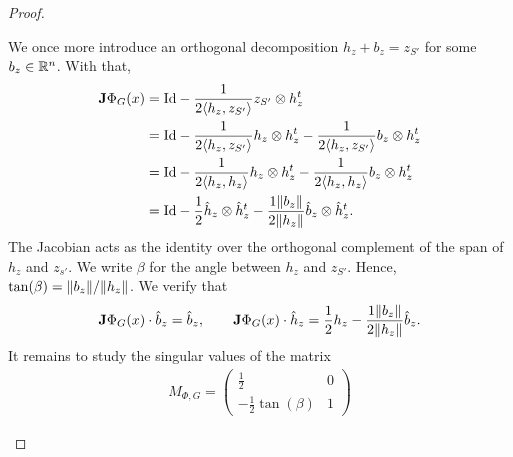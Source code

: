 \documentclass[10pt,a4paper]{article}
\begin{document}
\begin{proof}
\begin{itemize}
        We once more introduce an orthogonal decomposition $h_{z} + b_{z} = z_{S'}$ for some $b_{z} \in {\mathbb R}^{n}$.
        With that,
        \begin{align*}
            {\mathbf{J}} \Phi_{G}(x)
            &=
            {\rm Id} 
            - 
            \frac{1}{ 2 \langle h_{z},z_{S'}\rangle }  
            z_{S'} \otimes h_{z}^{t}
            \\
            &=
            {\rm Id} 
            - 
            \frac{1}{ 2 \langle h_{z},z_{S'}\rangle } 
            h_{z} \otimes h_{z}^{t}
            - 
            \frac{1}{ 2 \langle h_{z},z_{S'}\rangle } 
            b_{z} \otimes h_{z}^{t}
            \\
            &=
            {\rm Id} 
            - 
            \frac{1}{ 2 \langle h_{z}, h_{z}\rangle } 
            h_{z} \otimes h_{z}^{t}
            - 
            \frac{1}{ 2 \langle h_{z}, h_{z}\rangle } 
            b_{z} \otimes h_{z}^{t}
            \\
            &=
            {\rm Id} 
            - 
            \frac{1}{ 2 } 
            \hat h_{z} \otimes \hat h_{z}^{t}
            - 
            \frac{ 1 \|  b_{z}  \| }{ 2 \|  h_{z}  \| } 
            \hat b_{z} \otimes \hat h_{z}^{t}
            .
        \end{align*}
        The Jacobian acts as the identity over the orthogonal complement of the span of $h_{z}$ and $z_{s'}$.
        We write $\beta$ for the angle between $h_{z}$ and $z_{S'}$.
        Hence, $\tan(\beta) = \|  b_{z}  \| / \|  h_{z}  \|$. 
        We verify that 
        \begin{align}
            {\mathbf{J}} \Phi_{G}(x) \cdot \hat b_{z} = \hat b_{z},
            \qquad 
            {\mathbf{J}} \Phi_{G}(x) \cdot \hat h_{z} = \frac 1 2 h_{z} - \frac{ 1 \|  b_{z}  \| }{ 2 \|  h_{z}  \| } \hat b_{z}
            .
        \end{align}
        It remains to study the singular values of the matrix 
        \begin{align*}
            M_{\Phi,G} 
            = 
            \begin{pmatrix}
                 \frac 1 2             & 0 
                \\
                -\frac 1 2 \tan(\beta) & 1 
            \end{pmatrix}

\end{align*}
\end{itemize}
\end{proof}
\end{document}
